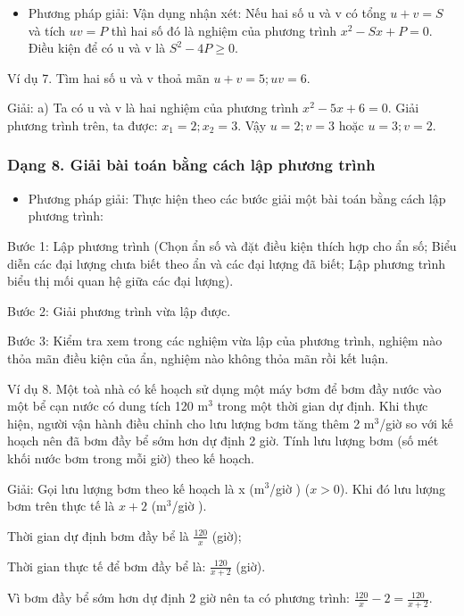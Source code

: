 \documentclass[%
    fontsize=12pt,%
    chapterprefix=false,%
    open=right,%
    twoside=false,%
    numbers=noenddot,%
    headings=optiontohead,%
    final,%
    DIV=15,%
    parskip=half %
]{scrbook}
\begin{document}
\begin{itemize}
  \item Phương pháp giải: Vận dụng nhận xét: Nếu hai số u và v có tổng $ u + v = S $ và tích $ uv = P $ thì hai số đó là nghiệm của phương trình $ x^2 - Sx + P = 0 $. Điều kiện để có u và v là $ S^2 - 4P \geq 0 $.
\end{itemize}


Ví dụ 7. Tìm hai số u và v thoả mãn $ u + v = 5; uv = 6 $.

Giải: a) Ta có u và v là hai nghiệm của phương trình $ x^2 - 5x + 6 = 0 $. Giải phương trình trên, ta được: $ x_1 = 2; x_2 = 3 $. Vậy $ u = 2; v = 3 $ hoặc $ u = 3; v = 2 $.
\subsubsection{Dạng 8. Giải bài toán bằng cách lập phương trình}

\begin{itemize}
  \item Phương pháp giải: Thực hiện theo các bước giải một bài toán bằng cách lập phương trình:
\end{itemize}

Bước 1: Lập phương trình (Chọn ẩn số và đặt điều kiện thích hợp cho ẩn số; Biểu diễn các đại lượng chưa biết theo ẩn và các đại lượng đã biết; Lập phương trình biểu thị mối quan hệ giữa các đại lượng).

Bước 2: Giải phương trình vừa lập được.

Bước 3: Kiểm tra xem trong các nghiệm vừa lập của phương trình, nghiệm nào thỏa mãn điều kiện của ẩn, nghiệm nào không thỏa mãn rồi kết luận.

Ví dụ 8. Một toà nhà có kế hoạch sử dụng một máy bơm để bơm đầy nước vào một bể cạn nước có dung tích 120 m$^3$ trong một thời gian dự định. Khi thực hiện, người vận hành điều chỉnh cho lưu lượng bơm tăng thêm 2 m$^3$/giờ so với kế hoạch nên đã bơm đầy bể sớm hơn dự định 2 giờ. Tính lưu lượng bơm (số mét khối nước bơm trong mỗi giờ) theo kế hoạch.

Giải: Gọi lưu lượng bơm theo kế hoạch là x (m$^3$/giờ ) ($ x > 0 $). Khi đó lưu lượng bơm trên thực tế là $ x + 2 $ (m$^3$/giờ ).

Thời gian dự định bơm đầy bể là $ \frac{120}{x} $ (giờ);

Thời gian thực tế để bơm đầy bể là: $ \frac{120}{x + 2} $ (giờ).

Vì bơm đầy bể sớm hơn dự định 2 giờ nên ta có phương trình: $ \frac{120}{x} - 2 = \frac{120}{x + 2} $.
\end{document}
